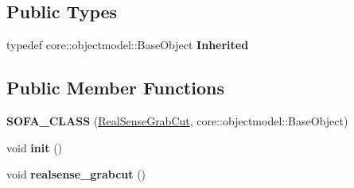 \subsection*{Public Types}
\begin{DoxyCompactItemize}
\item 
\mbox{\label{classsofa_1_1rgbdtracking_1_1_real_sense_grab_cut_a3d3643071d86257ce05bd3e86a603763}} 
typedef core\+::objectmodel\+::\+Base\+Object {\bfseries Inherited}
\end{DoxyCompactItemize}
\subsection*{Public Member Functions}
\begin{DoxyCompactItemize}
\item 
\mbox{\label{classsofa_1_1rgbdtracking_1_1_real_sense_grab_cut_ab15c9f5be96ddd1ab0aefdab7701ad2b}} 
{\bfseries S\+O\+F\+A\+\_\+\+C\+L\+A\+SS} (\hyperlink{classsofa_1_1rgbdtracking_1_1_real_sense_grab_cut}{Real\+Sense\+Grab\+Cut}, core\+::objectmodel\+::\+Base\+Object)
\item 
\mbox{\label{classsofa_1_1rgbdtracking_1_1_real_sense_grab_cut_a07ca12538fc84db6c54dfb9d4302a66b}} 
void {\bfseries init} ()
\item 
\mbox{\label{classsofa_1_1rgbdtracking_1_1_real_sense_grab_cut_abd67d6e789b641b9ca90ad9b221b8ad4}} 
void {\bfseries realsense\+\_\+grabcut} ()
\end{DoxyCompactItemize}
